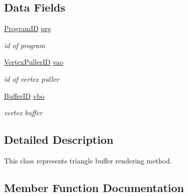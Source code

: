 \subsection*{Data Fields}
\begin{DoxyCompactItemize}
\item 
\mbox{\label{classTriangleBufferMethod_a692dd8c164b3116b965edceb5792f428}} 
\hyperlink{fwd_8hpp_a46ffd067c21ab50f5f1fcfed5d8bfc15}{Program\+ID} \hyperlink{classTriangleBufferMethod_a692dd8c164b3116b965edceb5792f428}{prg}
\begin{DoxyCompactList}\small\item\em id of program \end{DoxyCompactList}\item 
\mbox{\label{classTriangleBufferMethod_a26520fbbc3ddf936a2d61d2bf0d9f1fd}} 
\hyperlink{fwd_8hpp_af6f78f73099477c9ce5537d657597486}{Vertex\+Puller\+ID} \hyperlink{classTriangleBufferMethod_a26520fbbc3ddf936a2d61d2bf0d9f1fd}{vao}
\begin{DoxyCompactList}\small\item\em id of vertex puller \end{DoxyCompactList}\item 
\mbox{\label{classTriangleBufferMethod_a5426e29ed114e5e53f35e3a439e11d7d}} 
\hyperlink{fwd_8hpp_a5114031b77b80ad895eff688720b7f93}{Buffer\+ID} \hyperlink{classTriangleBufferMethod_a5426e29ed114e5e53f35e3a439e11d7d}{vbo}
\begin{DoxyCompactList}\small\item\em vertex buffer \end{DoxyCompactList}\end{DoxyCompactItemize}


\subsection{Detailed Description}
This class represents triangle buffer rendering method. 

\subsection{Member Function Documentation}
\mbox{\label{classTriangleBufferMethod_ae4339a5479f2f4fe9ca5964d5f7f1f74}} 
